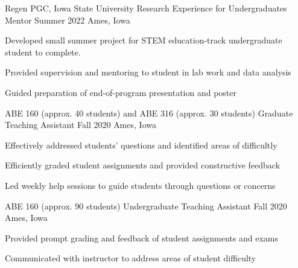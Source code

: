 

\begin{cventries}

  \cventry
    {Regen PGC, Iowa State University} %
    {Research Experience for Undergraduates Mentor} %
    {Summer 2022} %
    {Ames, Iowa} %
    {
      \begin{cvitems} %
      \setlength\itemsep{.4em}
        \item {Developed small summer project for STEM education-track undergraduate student to complete.}
        \item {Provided supervision and mentoring to student in lab work and data analysis}
        \item {Guided preparation of end-of-program presentation and poster}
      \end{cvitems}
    }
\vspace*{.5cm}
 \cventry
    {ABE 160 (approx. 40 students) and ABE 316 (approx. 30 students)} %
    {Graduate Teaching Assistant} %
    {Fall 2020} %
    {Ames, Iowa} %
    {
      \begin{cvitems} %
      \setlength\itemsep{.4em}
        \item {Effectively addressed students’ questions and identified areas of difficultly}
        \item {Efficiently graded student assignments and provided constructive feedback}
        \item {Led weekly help sessions to guide students through questions or concerns}
      \end{cvitems}
    }
\vspace*{.5cm}
 \cventry
    {ABE 160 (approx. 90 students)} %
    {Undergraduate Teaching Assistant} %
    {Fall 2020} %
    {Ames, Iowa} %
    {
      \begin{cvitems} %
      \setlength\itemsep{.4em}
        \item {Provided prompt grading and feedback of student assignments and exams}
        \item {Communicated with instructor to address areas of student difficulty}
      \end{cvitems}
    }
\end{cventries}
